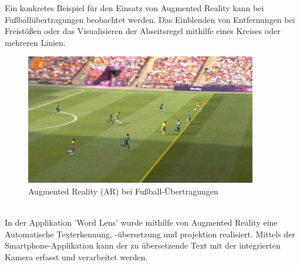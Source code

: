 \documentclass[11pt, a4paper]{article}
\begin{document}
Ein konkretes Beispiel f\"ur den Einsatz von Augmented Reality kann bei Fu\ss{}ball\"ubertragungen beobachtet werden. Das Einblenden von Entfernungen bei Freist\"o\ss{}en oder das Visualisieren der Abseitsregel mithilfe eines Kreises oder mehreren Linien.
\begin{figure}[h!]
		\centering
		\includegraphics[width=0.9\textwidth]{graphics/augmented-reality/abseits}
		\caption{Augmented Reality (AR) bei Fu\ss{}ball-\"Ubertragungen{\cite{ar-soccer}}}
\end{figure} \\
\noindent In der Applikation 'Word Lens' wurde mithilfe von Augmented Reality eine Automatische Texterkennung, -\"ubersetzung und projektion realisiert. Mittels der Smartphone-Applikation kann der zu \"ubersetzende Text mit der integrierten Kamera erfasst und verarbeitet werden.
\end{document}

